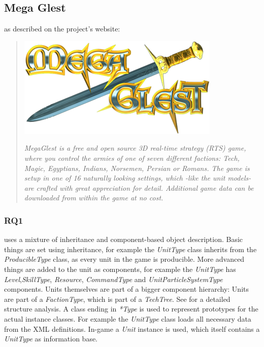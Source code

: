 \subsection{Mega Glest}
\GLEST{} as described on the project's website:
\begin{quote}

\begin{center}\includegraphics[scale=0.5]{pics/glestlogo}\end{center}

\textit{MegaGlest is a free and open source 3D real-time strategy (RTS) game, where you control the armies of one of
seven different factions: Tech, Magic, Egyptians, Indians, Norsemen, Persian or Romans. The game is setup in one of 16
naturally looking settings, which -like the unit models- are crafted with great appreciation for detail. Additional game
data can be downloaded from within the game at no cost.}
\end{quote}

\subsubsection{RQ1}
\GLEST{} uses a mixture of inheritance and component-based object description. Basic things are set using
inheritance, for example the \textit{UnitType} class inherits from the \textit{ProducibleType} class, as every unit in
the game is producible. More advanced things are added to the unit as components, for example the \textit{UnitType} has
\textit{Level},\textit{SkillType}, \textit{Resource}, \textit{CommandType} and \textit{UnitParticleSystemType}
components. Units themselves are part of a bigger component hierarchy: Units are part of a \textit{FactionType}, which
is part of a \textit{TechTree}. See  for a detailed structure analysis. A class ending in
\textit{*Type} is used to represent prototypes for the actual instance classes. For example the \textit{UnitType} class loads all
necessary data from the XML definitions. In-game a \textit{Unit} instance is used, which itself contains a
\textit{UnitType} as information base.


